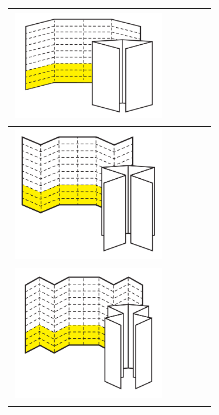 \begin{longtable}{|m{}|m{}|m{}|m{}|}
    \hline
     \includegraphics[width=110pt, keepaspectratio]{../media/cap4/secoes/pngs/ativ2_fig04.png} & &&\\
    \hline
     \includegraphics[width=110pt, keepaspectratio]{../media/cap4/secoes/pngs/ativ2_fig05.png}  &                                     &                                  &                                                   \\
    \hline
     \includegraphics[width=110pt, keepaspectratio]{../media/cap4/secoes/pngs/ativ2_fig06.png} &                                     &                                  &                                                   \\
    \hline
  \end{longtable}


